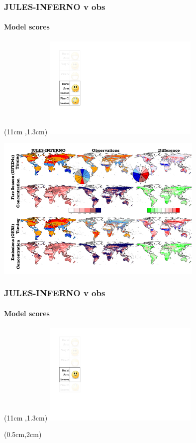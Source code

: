 \begin{frame}[label = kelley2013Datasets]
	\frametitle{JULES-INFERNO v obs}
	\framesubtitle{Model scores}
	
	\begin{textblock*}{8cm}(11cm ,1.3cm)
		\includegraphics[width=7.5cm]{images/Smileys/BAFireCseason.png}
	\end{textblock*}
	
	\includegraphics[width=10cm]{images/julesPerformance/FireMapsSeason.png}
	
\end{frame}

\begin{frame}[label = kelley2013Datasets]
	\frametitle{JULES-INFERNO v obs}
	\framesubtitle{Model scores}
	
	\begin{textblock*}{8cm}(11cm ,1.3cm)
		\includegraphics[width=7.5cm]{images/Smileys/BAseason.png}
	\end{textblock*}
	
	\begin{textblock*}{14cm}(0.5cm,2cm)
	\end{textblock*}
\end{frame}

%	

